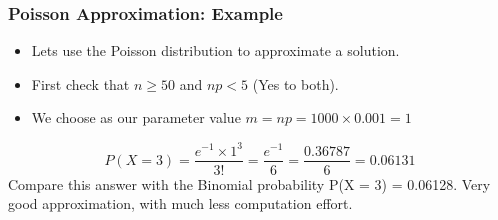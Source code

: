 \begin{frame}
	\frametitle{Poisson Approximation: Example}
	\begin{itemize}
		\item Lets use the Poisson distribution to approximate a solution.
		\item First check that $n \geq 50$ and $np < 5$ (Yes to both).
		\item We choose as our parameter value $m = np = 1000 \times 0.001 = 1$
	\end{itemize}
	\[P(X = 3) = \frac{e^{-1} \times 1^3}{3!} = \frac{e^{-1}}{6} = \frac{0.36787}{6} = 0.06131 \]
	Compare this answer with the Binomial probability
	P(X = 3) = 0.06128.
	Very good approximation, with much less computation effort.
\end{frame}


